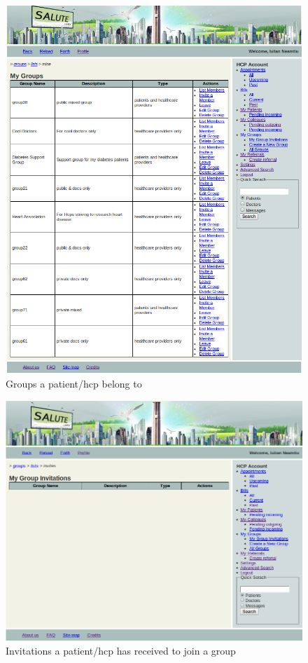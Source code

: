 \begin{figure}
\includegraphics[scale=0.5]{screenshots/my_groups.png}
\caption{Groups a patient/hcp belong to}
\end{figure}

\begin{figure}
\includegraphics[scale=0.5]{screenshots/my_group_invitations.png}
\caption{Invitations a patient/hcp has received to join a group}
\end{figure}


